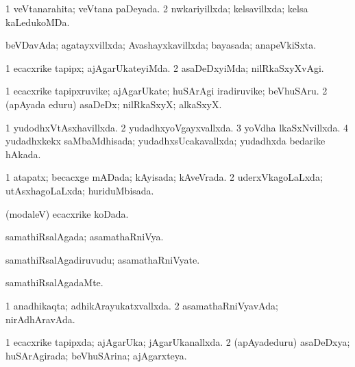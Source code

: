 {{\bentry
{} 
\gl{\gu}
\expl{}
\bmng
\bnum
\num{1} veVtanarahita; veVtana paDeyada. 
\num{2} nwkariyillxda; kelsavillxda; kelsa kaLedukoMDa. 
\enum
\emng
\eentry

\bentry
{} 
\gl{\gu}
\expl{}
\bmng
beVDavAda; agatayxvillxda; Avashayxkavillxda; bayasada; anapeVkiSxta. 
\emng
\eentry

\bentry
{} 
\gl{\kirxvi}
\expl{}
\bmng
\bnum
\num{1} ecacxrike tapipx; ajAgarUkateyiMda. 
\num{2} asaDeDxyiMda; nilRkaSxyXvAgi. 
\enum
\emng
\eentry

\bentry
{} 
\gl{\nA}
\expl{}
\bmng
\bnum
\num{1} ecacxrike tapipxruvike; ajAgarUkate; huSArAgi iradiruvike; beVhuSAru. 
\num{2} (apAyada eduru) asaDeDx; nilRkaSxyX; alkaSxyX. 
\enum
\emng
\eentry

\bentry
{} 
\gl{\gu}
\expl{}
\bmng
\bnum
\num{1} yudodhxVtAsxhavillxda. 
\num{2} yudadhxyoVgayxvallxda. 
\num{3} yoVdha lkaSxNvillxda. 
\num{4} yudadhxkekx saMbaMdhisada; yudadhxsUcakavallxda; yudadhxda bedarike hAkada. 
\enum
\emng
\eentry

\bentry
{} 
\gl{\gu}
\expl{}
\bmng
\bnum
\num{1} atapatx; becacxge mADada; kAyisada; kAveVrada. 
\num{2} uderxVkagoLaLxda; utAsxhagoLaLxda; huriduMbisada. 
\enum
\emng
\eentry

\bentry
{} 
\gl{\gu}
\expl{}
\bmng
(modaleV) ecacxrike koDada. 
\emng
\eentry

\bentry
{} 
\gl{\gu}
\expl{}
\bmng
samathiRsalAgada; asamathaRniVya. 
\emng
\eentry

\bentry
{} 
\gl{\nA}
\expl{}
\bmng
samathiRsalAgadiruvudu; asamathaRniVyate. 
\emng
\eentry

\bentry
{} 
\gl{\kirxvi}
\expl{}
\bmng
samathiRsalAgadaMte. 
\emng
\eentry

\bentry
{} 
\gl{\gu}
\expl{}
\bmng
\bnum
\num{1} anadhikaqta; adhikArayukatxvallxda. 
\num{2} asamathaRniVyavAda; nirAdhAravAda. 
\enum
\emng
\eentry

\bentry
{} 
\gl{\gu}
\expl{}
\bmng
\bnum
\num{1} ecacxrike tapipxda; ajAgarUka; jAgarUkanallxda. 
\num{2} (apAyadeduru) asaDeDxya; huSArAgirada; beVhuSArina; ajAgarxteya. 
\enum
\emng
\eentry

}}
